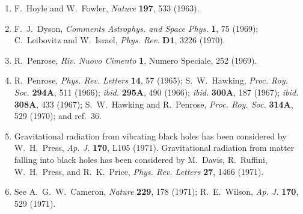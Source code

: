 \begin{enumerate}
  \item {}\label{ch11-ref-34}
  F.~Hoyle and W.~Fowler, \emph{Nature} \textbf{197}, 533 (1963).

  \item {}\label{ch11-ref-35}
  F.~J.~Dyson, \emph{Comments Astrophys. and Space Phys.} \textbf{1}, 75
  (1969); C.~Leibovitz and W.~Israel, \emph{Phys. Rev.} \textbf{D1}, 3226
  (1970).

  \item {}\label{ch11-ref-36}
  R.~Penrose, \emph{Riv. Nuovo Cimento} \textbf{1}, Numero Speciale, 252
  (1969).

  \item {}\label{ch11-ref-37}
  R.~Penrose, \emph{Phys. Rev. Letters} \textbf{14}, 57 (1965);
  S.~W.~Hawking, \emph{Proc. Roy. Soc.} \textbf{294A}, 511 (1966);
  \emph{ibid.} \textbf{295A}, 490 (1966);
  \emph{ibid.} \textbf{300A}, 187 (1967);
  \emph{ibid.} \textbf{308A}, 433 (1967);
  S.~W.~Hawking and R.~Penrose, \emph{Proc. Roy. Soc.} \textbf{314A}, 529
  (1970); and ref.~36.

  \item {}\label{ch11-ref-38}
  Gravitational radiation from vibrating black holes has been considered by
  W.~H.~Press, \emph{Ap. J.} \textbf{170}, L105 (1971). Gravitational
  radiation from matter falling into black holes has been considered by
  M.~Davis, R.~Ruffini, W.~H.~Press, and R.~K.~Price,
  \emph{Phys. Rev. Letters} \textbf{27}, 1466 (1971).

  \item {}\label{ch11-ref-39}
  See A.~G.~W.~Cameron, \emph{Nature} \textbf{229}, 178 (1971);
  R.~E.~Wilson, \emph{Ap. J.} \textbf{170}, 529 (1971).
\end{enumerate}
